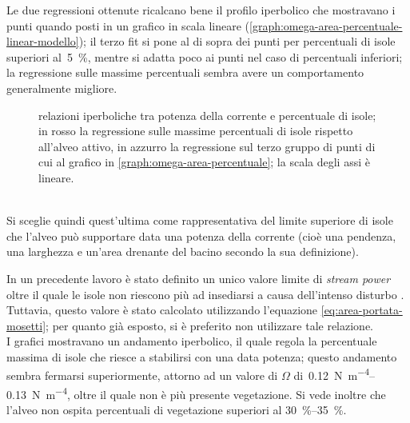 Le due regressioni ottenute ricalcano bene il profilo iperbolico che mostravano i punti quando posti in un grafico in scala lineare (\cref{graph:omega-area-percentuale-linear-modello}); il terzo fit si pone al di sopra dei punti per percentuali di isole superiori al~\SI{5}{\percent}, mentre si adatta poco ai punti nel caso di percentuali inferiori; la regressione sulle massime percentuali sembra avere un comportamento generalmente migliore.
%
\begin{figure}
	\centering
	
	\caption[relazioni iperboliche tra potenza della corrente e percentuale di isole]{relazioni iperboliche tra potenza della corrente e percentuale di isole; in rosso la regressione sulle massime percentuali di isole rispetto all'alveo attivo, in azzurro la regressione sul terzo gruppo di punti di cui al grafico in \cref{graph:omega-area-percentuale}; la scala degli assi è lineare.}
	\label{graph:omega-area-percentuale-linear-regressioni}
\end{figure}
%
\\
Si sceglie quindi quest'ultima come rappresentativa del limite superiore di isole che l'alveo può supportare data una potenza della corrente (cioè una pendenza, una larghezza e un'area drenante del bacino secondo la sua definizione).

In un precedente lavoro è stato definito un unico valore limite di \emph{stream power} oltre il quale le isole non riescono più ad insediarsi a causa dell'intenso disturbo .
Tuttavia, questo valore è stato calcolato utilizzando l'equazione \eqref{eq:area-portata-mosetti}; per quanto già esposto, si è preferito non utilizzare tale relazione.
\\
I grafici mostravano un andamento iperbolico, il quale regola la percentuale massima di isole che riesce a stabilirsi con una data potenza;
questo andamento sembra fermarsi superiormente, attorno ad un valore di $\Omega$ di~\SIrange[range-phrase={-}, range-units = single]{0.12}{0.13}{\newton\per\metre\tothe{4}}, oltre il quale non è più presente vegetazione.
Si vede inoltre che l'alveo non ospita percentuali di vegetazione superiori al \SIrange[range-phrase={-}, range-units = single]{30}{35}{\percent}.

